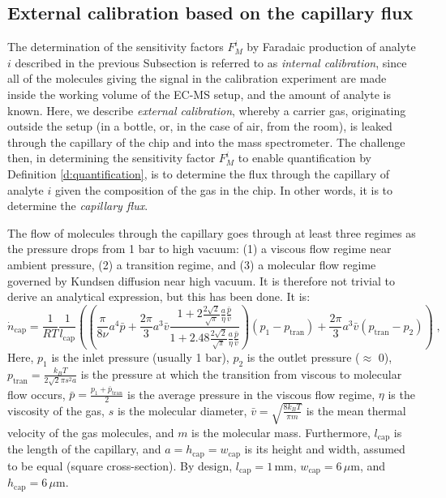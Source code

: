 \subsection{External calibration based on the capillary flux}\label{subsec:capillary}

The determination of the sensitivity factors $F_M^i$ by Faradaic production of analyte $i$ described in the previous Subsection is referred to as \textit{internal calibration}, since all of the molecules giving the signal in the calibration experiment are made inside the working volume of the EC-MS setup, and the amount of analyte is known. Here, we describe \textit{external calibration}, whereby a carrier gas, originating outside the setup (in a bottle, or, in the case of air, from the room), is leaked through the capillary of the chip and into the mass spectrometer. The challenge then, in determining the sensitivity factor $F_M^i$ to enable quantification by Definition \ref{d:quantification}, is to determine the flux through the capillary of analyte $i$ given the composition of the gas in the chip. In other words, it is to determine the \textit{capillary flux}. 

The flow of molecules through the capillary goes through at least three regimes as the pressure drops from 1 bar to high vacuum\cite{Henriksen2009}: (1) a viscous flow regime near ambient pressure, (2) a transition regime, and (3) a molecular flow regime governed by Kundsen diffusion near high vacuum. It is therefore not trivial to derive an analytical expression, but this has been done. It is\cite{Trimarco2017_PhD}:
\begin{equation}
\dot{n}_{\mathrm{cap}} = \frac{1}{R T}\frac{1}{l_\text{cap}} 
\left(\left( 
\frac{\pi}{8\nu}a^4\bar{p} + \frac{2\pi}{3}a^3\bar{v} \frac {1+2\frac{2\sqrt{2}}{\sqrt{\pi}}\frac{a}{\eta}\frac{\bar{p}}{\bar{v}}} {1+2.48\frac{2\sqrt{2}}{\sqrt{\pi}}\frac{a}{\eta}\frac{\bar{p}}{\bar{v}}}
\right)
\left(p_1-p_{\mathrm{tran}}\right) 
+ 
\frac{2\pi}{3}a^3\bar{v}\left(p_{\mathrm{tran}}-p_2\right)\right) 
\;, \label{eq:capillary}
\end{equation}
Here, $p_1$ is the inlet pressure (usually 1 bar), $p_2$ is the outlet pressure ($\approx$ 0), $p_{\mathrm{tran}}=\frac{k_B T}{2 \sqrt{2}\pi s^2 a}$ is the pressure at which the transition from viscous to molecular flow occurs, $\bar{p}=\frac{p_1 + \bar{p}_{\mathrm{tran}}}{2}$ is the average pressure in the viscous flow regime, $\eta$ is the viscosity of the gas, $s$ is the molecular diameter, $\bar{v}=\sqrt{\frac{8 k_B T}{\pi m}}$ is the mean thermal velocity of the gas molecules, and $m$ is the molecular mass. Furthermore, $l_\text{cap}$ is the length of the capillary, and $a=h_\text{cap}=w_\text{cap}$ is its height and width, assumed to be equal (square cross-section). By design, $l_\text{cap} = 1\,\text{mm}$, $w_\text{cap} = 6\,\mu\text{m}$, and $h_\text{cap} = 6\,\mu\text{m}$.

